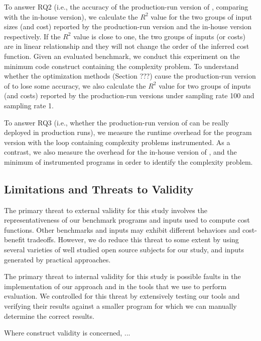 To answer RQ2 (i.e., the accuracy of the production-run version of \Tool, 
comparing with the in-house version),
we calculate the $R^2$ value for the two groups of input sizes (and cost) reported by 
the production-run version
and the in-house version respectively.
If the $R^2$ value is close to one, the two groups of inputs (or costs) 
are in linear relationship and they will not change 
the order of the inferred cost function. 
Given an evaluated benchmark, we conduct this experiment 
on the minimum
code construct containing the complexity problem.
To understand whether the optimization methods
(Section ???) cause the production-run version of \Tool 
to lose some accuracy, we also calculate the $R^2$ value for two groups 
of inputs (and costs) reported by the production-run versions 
under sampling rate 100 and sampling rate 1. 

To answer RQ3 (i.e., whether the production-run version of \Tool 
can be really deployed in production runs), 
we measure the runtime overhead for the program version 
with the loop containing complexity problems instrumented. 
As a contrast, we also measure the overhead for the in-house version of \Tool, 
and the minimum of instrumented programs in order 
to identify the complexity problem.  



\subsection{Limitations and Threats to Validity}


The primary threat to external validity 
for this study involves the representativeness 
of our benchmark programs and inputs used
to compute cost functions.
Other benchmarks and inputs may exhibit different 
behaviors and cost-benefit tradeoffs.
However, we do reduce this threat to some extent by
using several varieties of well studied open source subjects 
for our study, and inputs generated by practical approaches.

The primary threat to internal validity for this study
is possible faults in the implementation of our approach
and in the tools that we use to perform evaluation.
We controlled for this threat by extensively testing
our tools and verifying their results against a smaller
program for which we can manually determine the correct results.

Where construct validity is concerned, ...

